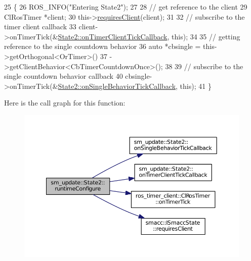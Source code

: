 \begin{DoxyCode}
25     \{
26         ROS\_INFO(\textcolor{stringliteral}{"Entering State2"});
27 
28         \textcolor{comment}{// get reference to the client}
29         ClRosTimer *client;
30         this->\hyperlink{classsmacc_1_1ISmaccState_a7f95c9f0a6ea2d6f18d1aec0519de4ac}{requiresClient}(client);
31 
32         \textcolor{comment}{// subscribe to the timer client callback}
33         client->onTimerTick(&\hyperlink{structsm__update_1_1State2_a217fac4964c4905921e215805f8b80be}{State2::onTimerClientTickCallback}, \textcolor{keyword}{this});
34 
35          \textcolor{comment}{// getting reference to the single countdown behavior}
36         \textcolor{keyword}{auto} *cbsingle = this->getOrthogonal<OrTimer>()
37                              ->getClientBehavior<CbTimerCountdownOnce>();
38 
39         \textcolor{comment}{// subscribe to the single countdown behavior callback}
40         cbsingle->onTimerTick(&\hyperlink{structsm__update_1_1State2_a652c5a4944bcff8dcb237937b340b7dd}{State2::onSingleBehaviorTickCallback}, \textcolor{keyword}{
      this});
41     \}
\end{DoxyCode}


Here is the call graph for this function\+:
\nopagebreak
\begin{figure}[H]
\begin{center}
\leavevmode
\includegraphics[width=350pt]{structsm__update_1_1State2_a4b85c8a77894cc78f017da0de9e2bfa3_cgraph}
\end{center}
\end{figure}


